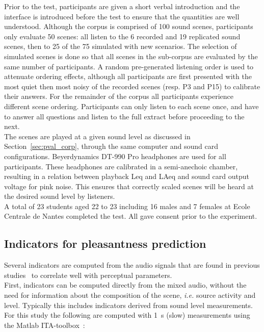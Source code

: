 \documentclass[11pt,a4paper]{article}
\begin{document}
Prior to the test, participants are given a short verbal introduction and the interface is introduced before the test to ensure that the quantities are well understood. Although the corpus is comprised of 100 sound scenes, participants only evaluate 50 scenes: all listen to the 6 recorded and 19 replicated sound scenes, then to 25 of the 75 simulated with new scenarios. The selection of simulated scenes is done so that all scenes in the sub-corpus are evaluated by the same number of participants. A random pre-generated listening order is used to attenuate ordering effects, although all participants are first presented with the most quiet then most noisy of the recorded scenes (resp. P3 and P15) to calibrate their answers. For the remainder of the corpus all participants experience different scene ordering. Participants can only listen to each scene once, and have to answer all questions and listen to the full extract before proceeding to the next.\\

The scenes are played at a given sound level as discussed in Section~\ref{sec:pval_corp}, through the same computer and sound card configurations. Beyerdynamics DT-990 Pro headphones are used for all participants. These headphones are calibrated in a semi-anechoic chamber, resulting in a relation between playback Leq and LAeq and sound card output voltage for pink noise. This ensures that correctly scaled scenes will be heard at the desired sound level by listeners.\\

A total of 23 students aged 22 to 23 including 16 males and 7 females at Ecole Centrale de Nantes completed the test. All gave consent prior to the experiment.

\subsection{Indicators for pleasantness prediction}
\label{sec:inds}

Several indicators are computed from the audio signals that are found in previous studies~\cite{aumond2017, gontier2018, ricciardi2014} to correlate well with perceptual parameters.\\

First, indicators can be computed directly from the mixed audio, without the need for information about the composition of the scene, \textit{i.e.} source activity and level. Typically this includes indicators derived from sound level measurements. For this study the following are computed with 1~s (slow) measurements using the Matlab ITA-toolbox~\cite{itatoolbox2017}:
\end{document}
